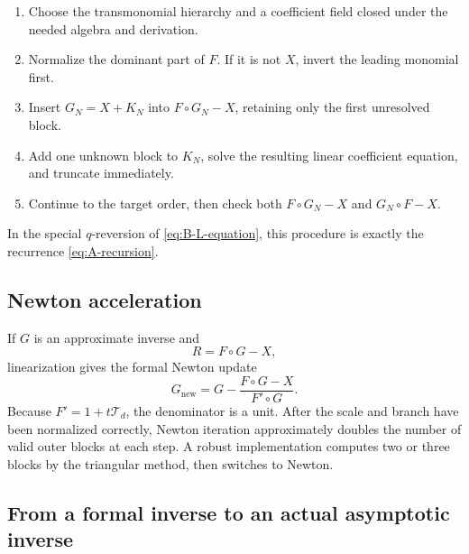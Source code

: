 \documentclass[11pt,a4paper]{article}
\numberwithin{equation}{section}
\theoremstyle{definition}
\theoremstyle{remark}
\newcommand{\Tfield}{\mathscr T}
\begin{document}
\begin{methodbox}[title={Coefficient-by-coefficient reversal}]
\begin{enumerate}
\item Choose the transmonomial hierarchy and a coefficient field closed
      under the needed algebra and derivation.
\item Normalize the dominant part of \(F\).  If it is not \(X\), invert
      the leading monomial first.
\item Insert \(G_N=X+K_N\) into \(F\circ G_N-X\), retaining only the
      first unresolved block.
\item Add one unknown block to \(K_N\), solve the resulting linear
      coefficient equation, and truncate immediately.
\item Continue to the target order, then check both
      \(F\circ G_N-X\) and \(G_N\circ F-X\).
\end{enumerate}
\end{methodbox}

In the special \(q\)-reversion of \cref{eq:B-L-equation}, this procedure is
exactly the recurrence \eqref{eq:A-recursion}.

\subsection{Newton acceleration}

If \(G\) is an approximate inverse and
\begin{equation}\label{eq:general-residual}
  R=F\circ G-X,
\end{equation}
linearization gives the formal Newton update
\begin{equation}\label{eq:general-newton}
  G_{\mathrm{new}}
  =G-\frac{F\circ G-X}{F'\circ G}.
\end{equation}
Because \(F'=1+t\Tfield_d\), the denominator is a unit.  After the scale
and branch have been normalized correctly, Newton iteration approximately
doubles the number of valid outer blocks at each step.  A robust
implementation computes two or three blocks by the triangular method,
then switches to Newton.

\subsection{From a formal inverse to an actual asymptotic inverse}
\end{document}
